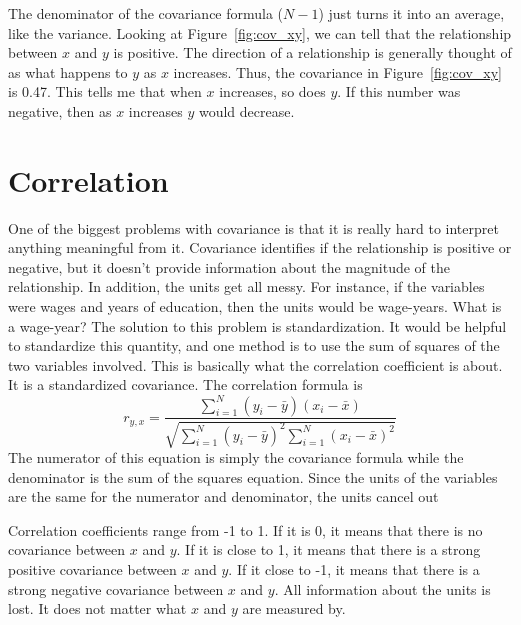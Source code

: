 The denominator of the covariance formula ($N-1$) just turns it into an average, like the variance. Looking at Figure~\ref{fig:cov_xy}, we can tell that the relationship between $x$ and $y$ is positive. The direction of a relationship is generally thought of as what happens to $y$ as $x$ increases. Thus, the covariance in Figure~\ref{fig:cov_xy} is 0.47. This tells me that when $x$ increases, so does $y$. If this number was negative, then as $x$ increases $y$ would decrease.
\section{Correlation}
One of the biggest problems with covariance is that it is really hard to interpret anything meaningful from it. Covariance identifies if the relationship is positive or negative, but it doesn't provide information about the magnitude of the relationship. In addition, the units get all messy. For instance, if the variables were wages and years of education, then the units would be wage-years. What is a wage-year? The solution to this problem is standardization. It would be helpful to standardize this quantity, and one method is to use the sum of squares of the two variables involved. This is basically what the correlation coefficient is about. It is a standardized covariance. The correlation formula is
\begin{equation}
  r_{y,x}=\frac{\sum_{i=1}^N\left(y_i-\bar{y}\right)\left(x_i-\bar{x}\right)}{\sqrt{\sum_{i=1}^N\left(y_i-\bar{y}\right)^2\sum_{i=1}^N\left(x_i-\bar{x}\right)^2}}
\end{equation}
The numerator of this equation is simply the covariance formula while the denominator is the sum of the squares equation. Since the units of the variables are the same for the numerator and denominator, the units cancel out

Correlation coefficients range from -1 to 1. If it is 0, it means that there is no covariance between $x$ and $y$. If it is close to 1, it means that there is a strong positive covariance between $x$ and $y$. If it close to -1, it means that there is a strong negative covariance between $x$ and $y$. All information about the units is lost. It does not matter what $x$ and $y$ are measured by.
